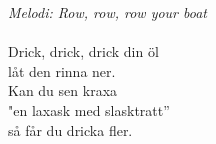 {\footnotesize\textit{Melodi: Row, row, row your boat}}\\
\\
Drick, drick, drick din öl\\
låt den rinna ner.\\
Kan du sen kraxa\\
"en laxask med slasktratt”\\
så får du dricka fler.\\